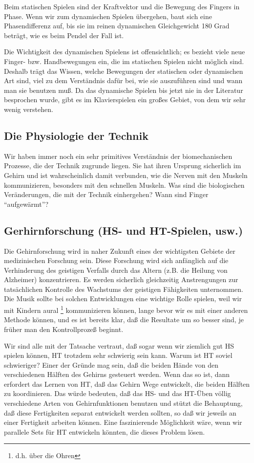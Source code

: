 Beim statischen Spielen sind der Kraftvektor und die Bewegung des Fingers in Phase.
Wenn wir zum dynamischen Spielen übergehen, baut sich eine Phasendifferenz auf, bis sie im reinen dynamischen Gleichgewicht 180 Grad beträgt, wie es beim Pendel der Fall ist.

Die Wichtigkeit des dynamischen Spielens ist offensichtlich; es bezieht viele neue Finger- bzw. Handbewegungen ein, die im statischen Spielen nicht möglich sind.
Deshalb trägt das Wissen, welche Bewegungen der statischen oder dynamischen Art sind, viel zu dem Verständnis dafür bei, wie sie auszuführen sind und wann man sie benutzen muß.
Da das dynamische Spielen bis jetzt nie in der Literatur besprochen wurde, gibt es im Klavierspielen ein großes Gebiet, von dem wir sehr wenig verstehen.


\subsection{Die Physiologie der Technik}\hypertarget{c1iv6b}{}

Wir haben immer noch ein sehr primitives Verständnis der biomechanischen Prozesse, die der Technik zugrunde liegen.
Sie hat ihren Ursprung sicherlich im Gehirn und ist wahrscheinlich damit verbunden, wie die Nerven mit den Muskeln kommunizieren, besonders mit den schnellen Muskeln.
Was sind die biologischen Veränderungen, die mit der Technik einhergehen?
Wann sind Finger \enquote{aufgewärmt}?


\subsection{Gerhirnforschung (HS- und HT-Spielen, usw.)}\hypertarget{c1iv6c}{}

Die Gehirnforschung wird in naher Zukunft eines der wichtigsten Gebiete der medizinischen Forschung sein.
Diese Forschung wird sich anfänglich auf die Verhinderung des geistigen Verfalls durch das Altern (z.B. die Heilung von Alzheimer) konzentrieren.
Es werden sicherlich gleichzeitig Anstrengungen zur tatsächlichen Kontrolle des Wachstums der geistigen Fähigkeiten unternommen.
Die Musik sollte bei solchen Entwicklungen eine wichtige Rolle spielen, weil wir mit Kindern aural \footnote{d.h. über die Ohren} kommunizieren können, lange bevor wir es mit einer anderen Methode können, und es ist bereits klar, daß die Resultate um so besser sind, je früher man den Kontrollprozeß beginnt.

Wir sind alle mit der Tatsache vertraut, daß sogar wenn wir ziemlich gut HS spielen können, HT trotzdem sehr schwierig sein kann.
Warum ist HT soviel schwieriger?
Einer der Gründe mag sein, daß die beiden Hände von den verschiedenen Hälften des Gehirns gesteuert werden.
Wenn das so ist, dann erfordert das Lernen von HT, daß das Gehirn Wege entwickelt, die beiden Hälften zu koordinieren.
Das würde bedeuten, daß das HS- und das HT-Üben völlig verschiedene Arten von Gehirnfunktionen benutzen und stützt die Behauptung, daß diese Fertigkeiten separat entwickelt werden sollten, so daß wir jeweils an einer Fertigkeit arbeiten können.
Eine faszinierende Möglichkeit wäre, wenn wir parallele Sets für HT entwickeln könnten, die dieses Problem lösen.


